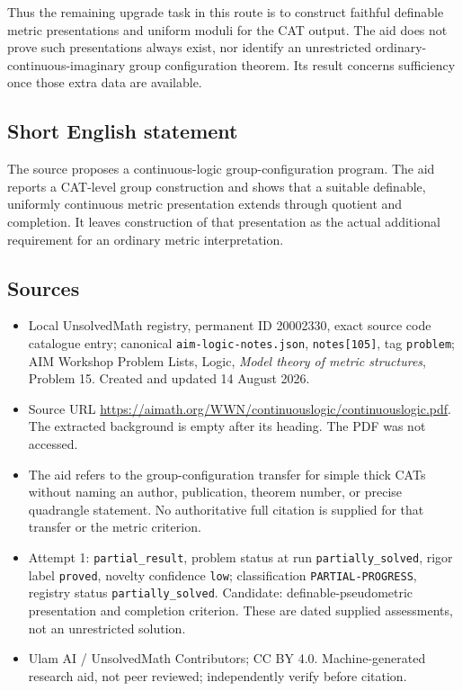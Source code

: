 \documentclass[11pt]{article}
\begin{document}
Thus the remaining upgrade task in this route is to construct faithful definable metric presentations and uniform moduli for the CAT output. The aid does not prove such presentations always exist, nor identify an unrestricted ordinary-continuous-imaginary group configuration theorem. Its result concerns sufficiency once those extra data are available.
\subsection{Short English statement}
The source proposes a continuous-logic group-configuration program. The aid reports a CAT-level group construction and shows that a suitable definable, uniformly continuous metric presentation extends through quotient and completion. It leaves construction of that presentation as the actual additional requirement for an ordinary metric interpretation.
\subsection{Sources}
\begin{itemize}
\item Local UnsolvedMath registry, permanent ID 20002330, exact source code catalogue entry; canonical \texttt{aim-logic-notes.json}, \texttt{notes[105]}, tag \texttt{problem}; AIM Workshop Problem Lists, Logic, \emph{Model theory of metric structures}, Problem 15. Created and updated 14 August 2026.
\item Source URL \url{https://aimath.org/WWN/continuouslogic/continuouslogic.pdf}. The extracted background is empty after its heading. The PDF was not accessed.
\item The aid refers to the group-configuration transfer for simple thick CATs without naming an author, publication, theorem number, or precise quadrangle statement. No authoritative full citation is supplied for that transfer or the metric criterion.
\item Attempt 1: \texttt{partial\_result}, problem status at run \texttt{partially\_solved}, rigor label \texttt{proved}, novelty confidence \texttt{low}; classification \texttt{PARTIAL-PROGRESS}, registry status \texttt{partially\_solved}. Candidate: definable-pseudometric presentation and completion criterion. These are dated supplied assessments, not an unrestricted solution.
\item Ulam AI / UnsolvedMath Contributors; CC BY 4.0. Machine-generated research aid, not peer reviewed; independently verify before citation.
\end{itemize}
\end{document}
